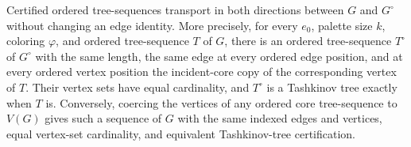 \begin{lemma}
Certified ordered tree-sequences transport in both directions between $G$
and $G^{\circ}$ without changing an edge identity.  More precisely, for
every $e_0$, palette size $k$, coloring $\varphi$, and ordered tree-sequence
$T$ of $G$, there is an ordered tree-sequence $T^{\circ}$ of $G^{\circ}$
with the same length, the same edge at every ordered edge position, and at
every ordered vertex position the incident-core copy of the corresponding
vertex of $T$.  Their vertex sets have equal cardinality, and
$T^{\circ}$ is a Tashkinov tree exactly when $T$ is.  Conversely, coercing
the vertices of any ordered core tree-sequence to $V(G)$ gives such a
sequence of $G$ with the same indexed edges and vertices, equal vertex-set
cardinality, and equivalent Tashkinov-tree certification.
\end{lemma}
